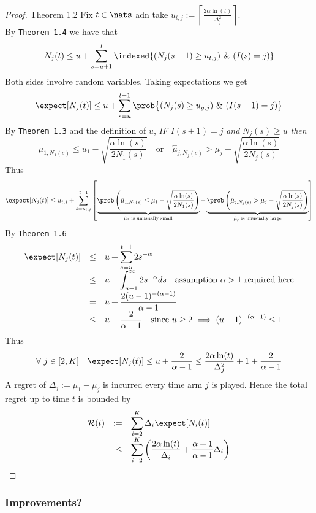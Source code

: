 \documentclass[11pt,a4paper]{article}
\begin{document}
\begin{proof}{Theorem 1.2}
  Fix $t\in\nats$ adn take $u_{t,j}:=\left\lceil\frac{2\alpha\ln(t)}{\Delta_j^2}\right\rceil$.\\
  By \texttt{Theorem 1.4} we have that
  \[ N_j(t)\leq u+\sum_{s=u+1}^t\indexed\{(N_j(s-1)\geq u_{t,j})\ \&\ (I(s)=j)\} \]
  Both sides involve random variables. Taking expectations we get
  \[ \expect[N_j(t)]\leq u+\sum_{s=u}^{t-1}\prob\big\{(N_j(s)\geq u_{y,j})\ \&\ (I(s+1)=j)\big\} \]
  By \texttt{Theorem 1.3} and the definition of $u$, \textit{IF} $I(s+1)=j$\textit{ and }$N_j(s)\geq u$\textit{ then}
  \[ \hat\mu_{1,N_1(s)}\leq u_1-\sqrt{\frac{\alpha\ln(s)}{2N_1(s)}}\quad\text{or}\quad\hat\mu_{j,N_j(s)}>\mu_j+\sqrt{\frac{\alpha\ln(s)}{2N_j(s)}} \]
  Thus
  \[ \expect[N_j(t)]\leq u_{t,j}+\sum_{s=u_{t,j}}^{t-1}\left[\underbrace{\prob\left(\hat\mu_{1,N_1(s)}\leq\mu_1-\sqrt{\frac{\alpha\ln(s)}{2N_1(s)}}\right)}_{\tiny\text{$\hat\mu_1$ is unusually small}}+\underbrace{\prob\left(\hat\mu_{j,N_j(s)}>\mu_j-\sqrt{\frac{\alpha\ln(s)}{2N_j(s)}}\right)}_{\tiny\text{$\hat\mu_j$ is unusually large}}\right] \]
  By \texttt{Theorem 1.6}
  \[\begin{array}{rcl}
  \expect[N_j(t)]&\leq&\displaystyle u+\sum_{s=u}^{t-1}2s^{-\alpha}\\
  &\leq&u+\displaystyle\int_{u-1}^\infty2s^{-\alpha}ds\quad\text{assumption $\alpha>1$ required here}\\
  &=&u+\displaystyle\frac{2(u-1)^{-(\alpha-1)}}{\alpha-1}\\
  &\leq&\displaystyle u+\frac{2}{\alpha-1}\quad\text{since }u\geq2\implies (u-1)^{-(\alpha-1)}\leq 1
  \end{array}\]
  Thus
  \[ \forall\ j\in[2,K]\quad\expect[N_j(t)]\leq u+\frac2{\alpha-1}\leq\frac{2\alpha\ln(t)}{\Delta^2_j}+1+\frac2{\alpha-1} \]
  A regret of $\Delta_j:=\mu_1-\mu_j$ is incurred every time arm $j$ is played. Hence the total regret up to time $t$ is bounded by
  \[\begin{array}{rrl}
    \mathcal{R}(t)&:=&\displaystyle\sum_{i=2}^K\Delta_i\expect[N_i(t)]\\
    &\leq&\displaystyle\sum_{i=2}^K\left(\frac{2\alpha\ln(t)}{\Delta_i}+\frac{\alpha+1}{\alpha-1}\Delta_i\right)
  \end{array}\]
  \proved
\end{proof}

\subsubsection{Improvements?}
\end{document}
